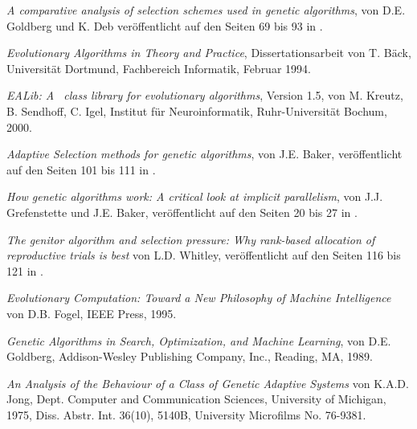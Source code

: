 \documentclass{report}
\begin{document}
\begin{thebibliography}{55}
    {\em A comparative analysis of selection schemes used in genetic
    algorithms}, von D.E. Goldberg und K. Deb ver\"offentlicht auf den
    Seiten 69 bis 93 in \cite{Foundations}.

    {\em Evolutionary Algorithms in Theory and Practice}, 
    Dissertationsarbeit von T. B\"ack, Universit\"at Dortmund, 
    Fachbereich Informatik, Februar 1994.
  
    {\em EALib: A \cpp\ class library for evolutionary
    algorithms}, Version 1.5, von M. Kreutz, B. Sendhoff, C. Igel,
    Institut f\"ur Neuroinformatik, Ruhr-Universit\"at Bochum, 
    2000.

    {\em Adaptive Selection methods for genetic algorithms}, von J.E. Baker, 
    ver\"offentlicht auf den Seiten 101 bis 111 in \cite{First}.

    {\em How genetic algorithms work: A critical look at implicit
    parallelism}, von J.J. Grefenstette und J.E. Baker, ver\"offentlicht
    auf den Seiten 20 bis 27 in \cite{Third}. 

    {\em The genitor algorithm and selection pressure:
    Why rank-based allocation of reproductive trials is best} von L.D.
    Whitley, ver\"offentlicht auf den Seiten 116 bis 121 in \cite{Third}.

    {\em Evolutionary Computation: Toward a New Philosophy of
    Machine Intelligence} von D.B. Fogel, IEEE Press, 1995.

    {\em Genetic Algorithms in Search, Optimization, and Machine Learning}, 
    von D.E. Goldberg, Addison-Wesley Publishing Company, Inc., Reading, MA, 
    1989.

    {\em An Analysis of the Behaviour of a Class of Genetic Adaptive
    Systems} von K.A.D. Jong, Dept. Computer and Communication Sciences,
    University of Michigan, 1975, Diss. Abstr. Int. 36(10), 5140B,
    University Microfilms No. 76-9381.

\end{thebibliography}
\end{document}
